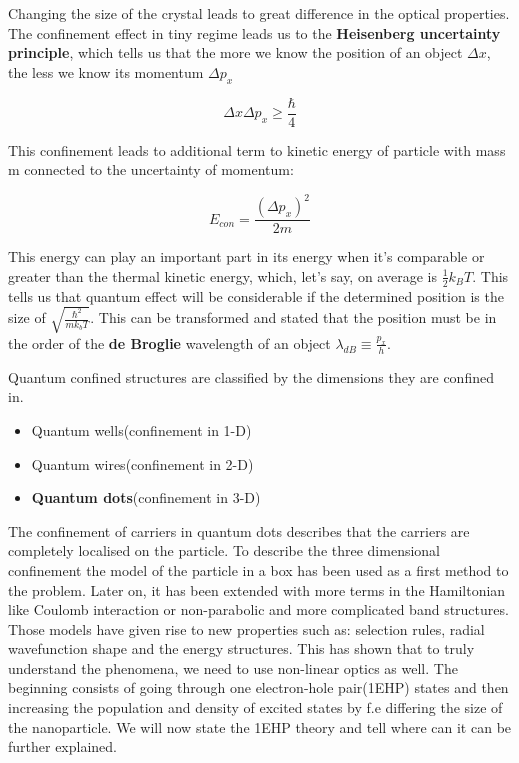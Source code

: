 Changing the size of the crystal leads to great difference in the optical properties. The confinement effect in tiny regime leads us to the \textbf{Heisenberg uncertainty principle}, which tells us that the more we know the position of an object $\Delta x$, the less we know its momentum $\Delta p_x$

\begin{equation}
\Delta x \Delta p_x \geq \frac{\hbar}{4}
\end{equation}

This confinement leads to additional term to kinetic energy of particle with mass m connected to the uncertainty of momentum:

\begin{equation}
E_{con} = \frac{(\Delta p_x)^2}{2m}
\end{equation}

This energy can play an important part in its energy when it's comparable or greater than the thermal kinetic energy, which, let's say, on average is $\frac{1}{2}k_BT$.
This tells us that quantum effect will be considerable if the determined position is the size of $\sqrt{\frac{\hbar ^2}{mk_bT}}$. This can be transformed and stated that the position must be in the order of the \textbf{de Broglie} wavelength of an object $\lambda_{dB} \equiv \frac{p_x}{h}$.

Quantum confined structures are classified by the dimensions they are confined in.

\begin{itemize}
\item Quantum wells(confinement in 1-D)
\item Quantum wires(confinement in 2-D)
\item \textbf{Quantum dots}(confinement in 3-D)
\end{itemize}

The confinement of carriers in quantum dots describes that the carriers are completely localised on the particle. To describe the three dimensional confinement the model of the particle in a box has been used as a first method to the problem. Later on, it has been extended with more terms in the Hamiltonian like Coulomb interaction or non-parabolic and more complicated band structures. Those models have given rise to new properties such as: selection rules, radial wavefunction shape and the energy structures. This has shown that to truly understand the phenomena, we need to use non-linear optics as well. The beginning consists of going through one electron-hole pair(1EHP) states and then increasing the population and density of excited states by f.e differing the size of the nanoparticle. We will now state the 1EHP theory and tell where can it can be further explained. 

